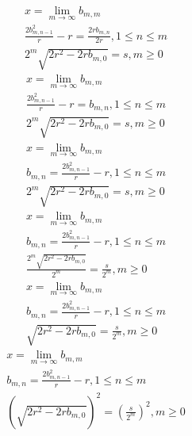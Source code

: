 \documentclass[a4paper,12pt]{report}
\begin{document}
\begin{subequations}
\begin{gather}
x = \lim \limits_{m \to \infty} b_{m,m} \\
\frac{2b_{m,n-1}^2}{r} - r = \frac{2rb_{m,n}}{2r}, 1 \leq n \leq m \\
2^m \sqrt{2r^2 - 2rb_{m,0}} = s, m \geq 0
\end{gather}
\end{subequations}
\begin{subequations}
\begin{gather}
x = \lim \limits_{m \to \infty} b_{m,m} \\
\frac{2b_{m,n-1}^2}{r} - r = b_{m,n}, 1 \leq n \leq m \\
2^m \sqrt{2r^2 - 2rb_{m,0}} = s, m \geq 0
\end{gather}
\end{subequations}
\begin{subequations}
\begin{gather}
x = \lim \limits_{m \to \infty} b_{m,m} \\
b_{m,n} = \frac{2b_{m,n-1}^2}{r} - r, 1 \leq n \leq m \\
2^m \sqrt{2r^2 - 2rb_{m,0}} = s, m \geq 0
\end{gather}
\end{subequations}
\begin{subequations}
\begin{gather}
x = \lim \limits_{m \to \infty} b_{m,m} \\
b_{m,n} = \frac{2b_{m,n-1}^2}{r} - r, 1 \leq n \leq m \\
\frac{2^m \sqrt{2r^2 - 2rb_{m,0}}}{2^m} = \frac{s}{2^m}, m \geq 0
\end{gather}
\end{subequations}
\begin{subequations}
\begin{gather}
x = \lim \limits_{m \to \infty} b_{m,m} \\
b_{m,n} = \frac{2b_{m,n-1}^2}{r} - r, 1 \leq n \leq m \\
\sqrt{2r^2 - 2rb_{m,0}} = \frac{s}{2^m}, m \geq 0
\end{gather}
\end{subequations}
\begin{subequations}
\begin{gather}
x = \lim \limits_{m \to \infty} b_{m,m} \\
b_{m,n} = \frac{2b_{m,n-1}^2}{r} - r, 1 \leq n \leq m \\
\left(\sqrt{2r^2 - 2rb_{m,0}}\right)^2 = \left(\frac{s}{2^m}\right)^2, m \geq 0
\end{gather}
\end{subequations}
\end{document}
